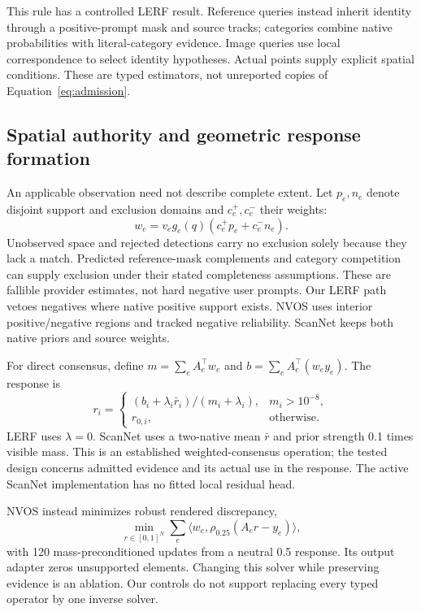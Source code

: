 This rule has a controlled LERF result. Reference queries instead inherit
identity through a positive-prompt mask and source tracks; categories combine
native probabilities with literal-category evidence. Image queries use local
correspondence to select identity hypotheses. Actual points supply explicit
spatial conditions. These are typed estimators, not unreported copies of
Equation~\ref{eq:admission}.

\subsection{Spatial authority and geometric response formation}
An applicable observation need not describe complete extent. Let $p_e,n_e$
denote disjoint support and exclusion domains and $c_e^+,c_e^-$ their weights:
\begin{equation}
 w_e=v_e g_e(q)(c_e^+p_e+c_e^-n_e).
 \label{eq:authority}
\end{equation}
Unobserved space and rejected detections carry no exclusion solely because they
lack a match. Predicted reference-mask complements and category competition can supply
exclusion under their stated completeness assumptions. These are fallible
provider estimates, not hard negative user prompts. Our LERF path vetoes negatives where
native positive support exists. NVOS uses interior positive/negative regions and
tracked negative reliability. ScanNet keeps both native priors and source weights.

For direct consensus, define $m=\sum_e A_e^\top w_e$ and
$b=\sum_e A_e^\top(w_ey_e)$. The response is
\begin{equation}
 r_i=\begin{cases}
 (b_i+\lambda_i\bar r_i)/(m_i+\lambda_i),&m_i>10^{-8},\\
 r_{0,i},&\text{otherwise}.
 \end{cases}
 \label{eq:consensus}
\end{equation}
LERF uses $\lambda=0$. ScanNet uses a two-native mean $\bar r$ and prior strength
0.1 times visible mass. This is an established weighted-consensus operation;
the tested design concerns admitted evidence and its actual use in the response.
The active ScanNet implementation has no fitted local residual head.

NVOS instead minimizes robust rendered discrepancy,
\begin{equation}
 \min_{r\in[0,1]^N}\sum_e\langle w_e,\rho_{0.25}(A_er-y_e)\rangle,
 \label{eq:reference}
\end{equation}
with 120 mass-preconditioned updates from a neutral 0.5 response. Its output
adapter zeros unsupported elements. Changing this solver while preserving
evidence is an ablation. Our controls do not support replacing every typed
operator by one inverse solver.


